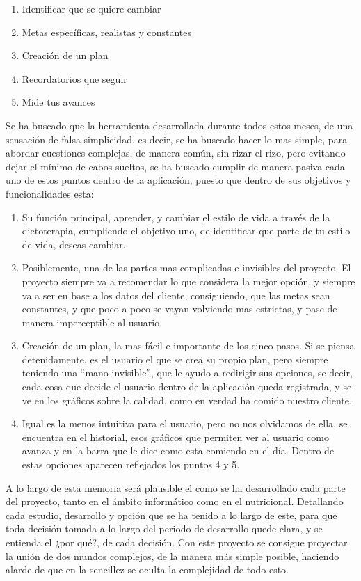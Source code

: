 \begin{enumerate}
\item	Identificar que se quiere cambiar
\item	Metas específicas, realistas y constantes
\item	Creación de un plan
\item	Recordatorios que seguir
\item	Mide tus avances
\end{enumerate}
Se ha buscado que la herramienta desarrollada durante todos estos meses, de una sensación de falsa simplicidad, es decir, se ha buscado hacer lo mas simple, para abordar cuestiones complejas, de manera común, sin rizar el rizo, pero evitando dejar el mínimo de cabos sueltos, se ha buscado cumplir de manera pasiva cada uno de estos puntos dentro de la aplicación, puesto que dentro de sus objetivos y funcionalidades esta:

\begin{enumerate}
\item	Su función principal, aprender, y cambiar el estilo de vida a través de la dietoterapia, cumpliendo el objetivo uno, de identificar que parte de tu estilo de vida, deseas cambiar.
\item	Posiblemente, una de las partes mas complicadas e invisibles del proyecto. El proyecto siempre va a recomendar lo que considera la mejor opción, y siempre va a ser en base a los datos del cliente, consiguiendo, que las metas sean constantes, y que poco a poco se vayan volviendo mas estrictas, y pase de manera imperceptible al usuario.
\item	Creación de un plan, la mas fácil e importante de los cinco pasos. Si se piensa detenidamente, es el usuario el que se crea su propio plan, pero siempre teniendo una “mano invisible”, que le ayudo a redirigir sus opciones, se decir, cada cosa que decide el usuario dentro de la aplicación queda registrada, y se ve en los gráficos sobre la calidad, como en verdad ha comido nuestro cliente.
\item Igual es la menos intuitiva para el usuario, pero no nos olvidamos de ella, se encuentra en el historial, esos gráficos que permiten ver al usuario como avanza y en la barra que le dice como esta comiendo en el día. Dentro de estas opciones aparecen reflejados los puntos 4 y 5.
\end{enumerate}

A lo largo de esta memoria será plausible el como se ha desarrollado cada parte del proyecto, tanto en el ámbito informático como en el nutricional. Detallando cada estudio, desarrollo y opción que se ha tenido a lo largo de este, para que toda decisión tomada a lo largo del periodo de desarrollo quede clara, y se entienda el ¿por qué?, de cada decisión. Con este proyecto se consigue proyectar la unión de dos mundos complejos, de la manera más simple posible, haciendo alarde de que en la sencillez se oculta la complejidad de todo esto.
